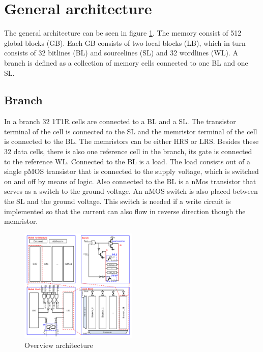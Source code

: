 \documentclass[journal]{IEEEtran}
\begin{document}
\section{General architecture}\label{Genach}
The general architecture can be seen in figure \ref{fig:architecture}. The memory consist of 512 global blocks (GB). Each GB consists of two local blocks (LB), which in turn consists of 32 bitlines (BL) and sourcelines (SL) and 32 wordlines (WL). A branch is defined as a collection of memory cells connected to one BL and one SL.

\subsection{Branch}
In a branch 32 1T1R cells are connected to a BL and a SL. The transistor terminal of the cell is connected to the SL and the memristor terminal of the cell is connected to the BL. The memristors can be either HRS or LRS. Besides these 32 data cells, there is also one reference cell in the branch, its gate is connected to the reference WL. Connected to the BL is a load. The load consists out of a single pMOS transistor that is connected to the supply voltage, which is switched on and off by means of logic. Also connected to the BL is a nMos transistor that serves as a switch to the ground voltage. An nMOS switch is also placed between the SL and the ground voltage. This switch is needed if a write circuit is implemented so that the current can also flow in reverse direction though the memristor.

\begin{figure}[b!]
  \centering
  \includegraphics[width=0.5\textwidth]{../fig/paper-architecture.png}
  \caption{Overview architecture}
  \label{fig:architecture}
\end{figure}
\end{document}

